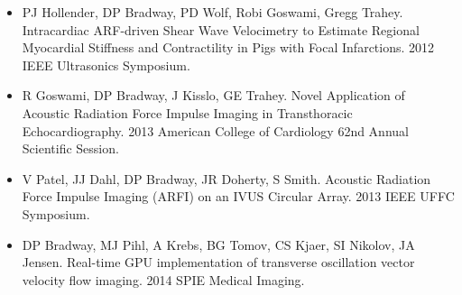 \documentclass[letterpaper,10pt,english]{sphinxmanual}
\begin{document}
\begin{itemize}
\item {} 
PJ Hollender, DP Bradway, PD Wolf, Robi Goswami, Gregg Trahey.
Intracardiac ARF-driven Shear Wave Velocimetry to Estimate Regional
Myocardial Stiffness and Contractility in Pigs with Focal
Infarctions. 2012 IEEE Ultrasonics Symposium.

\item {} 
R Goswami, DP Bradway, J Kisslo, GE Trahey. Novel Application of
Acoustic Radiation Force Impulse Imaging in Transthoracic
Echocardiography. 2013 American College of Cardiology 62nd Annual
Scientific Session.

\item {} 
V Patel, JJ Dahl, DP Bradway, JR Doherty, S Smith. Acoustic Radiation
Force Impulse Imaging (ARFI) on an IVUS Circular Array. 2013 IEEE
UFFC Symposium.

\item {} 
DP Bradway, MJ Pihl, A Krebs, BG Tomov, CS Kjaer, SI Nikolov, JA
Jensen. Real-time GPU implementation of transverse oscillation vector
velocity flow imaging. 2014 SPIE Medical Imaging.

\end{itemize}



\renewcommand{\indexname}{Index}
\printindex
\end{document}
